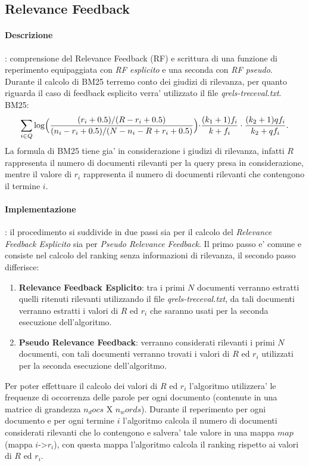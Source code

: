 \subsection{Relevance Feedback}
\label{sec:relevance-feedback}

\paragraph{\textbf{Descrizione}}: comprensione del Relevance Feedback (\textsc{RF}) e scrittura di una funzione di reperimento equipaggiata con \textit{RF esplicito} e una seconda con \textit{RF pseudo}.
Durante il calcolo di \textsc{BM25} terremo conto dei giudizi di rilevanza, per quanto riguarda il caso di feedback esplicito verra' utilizzato il file \textit{qrels-treceval.txt}.
BM25:
\[ \sum\limits_{i \in Q}\log\Bigl(\frac{(r_i+0.5)/(R-r_i+0.5)}{(n_i-r_i+0.5)/(N-n_i-R+r_i+0.5)}\Bigl)\cdot\frac{(k_1+1)f_i}{k+f_i}\cdot\frac{(k_2+1)qf_i}{k_2+qf_i}. \]
La formula di BM25 tiene gia' in considerazione i giudizi di rilevanza, infatti $R$ rappresenta il numero di documenti rilevanti per la query presa in considerazione, mentre il valore di $r_i$ rappresenta il numero di documenti rilevanti che contengono il termine $i$.

\paragraph{\textbf{Implementazione}}: il procedimento si suddivide in due passi sia per il calcolo del \textit{Relevance Feedback Esplicito} sia per \textit{Pseudo Relevance Feedback}.
Il primo passo e' comune e consiste nel calcolo del ranking senza informazioni di rilevanza, il secondo passo differisce:
\begin{enumerate}
\item \textbf{Relevance Feedback Esplicito}: tra i primi $N$ documenti verranno estratti quelli ritenuti rilevanti utilizzando il file \textit{qrels-treceval.txt}, da tali documenti verranno estratti i valori di $R$ ed $r_i$ che saranno usati per la seconda esecuzione dell'algoritmo.
\item \textbf{Pseudo Relevance Feedback}: verranno considerati rilevanti i primi $N$ documenti, con tali documenti verranno trovati i valori di $R$ ed $r_i$ utilizzati per la seconda esecuzione dell'algoritmo.
\end{enumerate}
Per poter effettuare il calcolo dei valori di $R$ ed $r_i$ l'algoritmo utilizzera' le frequenze di occorrenza delle parole per ogni documento (contenute in una matrice di grandezza $n_docs$ X $n_words$). Durante il reperimento per ogni documento e per ogni termine $i$ l'algoritmo calcola il numero di documenti considerati rilevanti che lo contengono e salvera' tale valore in una mappa $map$ (mappa $i$->$r_i$), con questa mappa l'algoritmo calcola il ranking rispetto ai valori di $R$ ed $r_i$.


